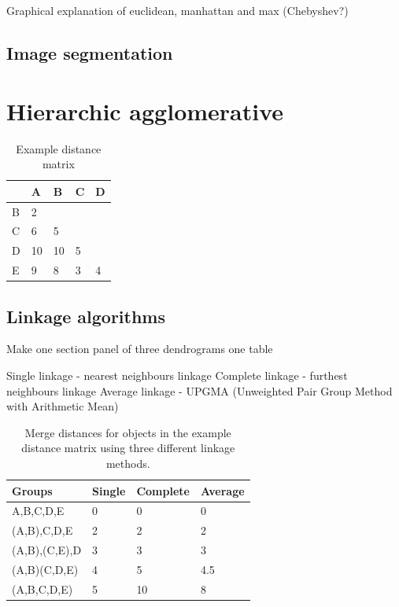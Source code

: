 \documentclass[]{book}
\theoremstyle{definition}
\theoremstyle{definition}
\theoremstyle{definition}
\theoremstyle{remark}
\begin{document}
Graphical explanation of euclidean, manhattan and max (Chebyshev?)

\subsection{Image segmentation}\label{image-segmentation}

\section{Hierarchic agglomerative}\label{hierarchic-agglomerative}

\begin{table}

\caption{\label{tab:distance-matrix}Example distance matrix}
\centering
\begin{tabular}[t]{lllll}
\toprule
  & A & B & C & D\\
\midrule
B & 2 &  &  & \\
C & 6 & 5 &  & \\
D & 10 & 10 & 5 & \\
E & 9 & 8 & 3 & 4\\
\bottomrule
\end{tabular}
\end{table}

\subsection{Linkage algorithms}\label{linkage-algorithms}

Make one section panel of three dendrograms one table

Single linkage - nearest neighbours linkage Complete linkage - furthest
neighbours linkage Average linkage - UPGMA (Unweighted Pair Group Method
with Arithmetic Mean)

\begin{table}

\caption{\label{tab:distance-merge}Merge distances for objects in the example distance matrix using three different linkage methods.}
\centering
\begin{tabular}[t]{llll}
\toprule
Groups & Single & Complete & Average\\
\midrule
A,B,C,D,E & 0 & 0 & 0\\
(A,B),C,D,E & 2 & 2 & 2\\
(A,B),(C,E),D & 3 & 3 & 3\\
(A,B)(C,D,E) & 4 & 5 & 4.5\\
(A,B,C,D,E) & 5 & 10 & 8\\
\bottomrule
\end{tabular}
\end{table}
\end{document}
